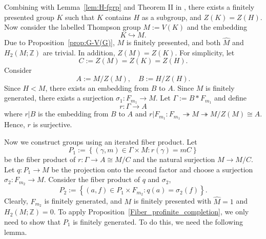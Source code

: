 \documentclass[11pt]{amsart}
\theoremstyle{definition}
\newcommand{\ZZ}{\mathbb{Z}}
\begin{document}
 Combining with Lemma~\ref{lem:H-fgrp} and Theorem II in \cite{houcine2007embeddings}, there exists a finitely presented group $K$ such that $K$ contains $H$ as a subgroup, and $Z(K)=Z(H)$.
 Now consider the labelled Thompson group $M:=V(K)$ and the embedding $$K \hookrightarrow M.$$
 Due to Proposition~\ref{prop:G-V(G)}, $M$ is finitely presented, and both $\widehat{M}$ and $H_2(M;\ZZ)$ are trivial.
 In addition, $Z(M)=Z(K)$.
 For simplicity, let $$ C:=Z(M)=Z(K)=Z(H). $$
 Consider $$ A:=M/Z(M), \quad B:= H / Z(H). $$
 Since $H<M$, there exists an embedding from $B$ to $A$.
 Since $M$ is finitely generated, there exists a surjection $\sigma_1:F_{m_1} \to M$.
 Let $\Gamma := B*F_{m_1} $ and define $$r:\Gamma \to A$$
 where $r|B$ is the embedding from $B$ to $A$ and $r|F_{m_1}:F_{m_1} \twoheadrightarrow M \twoheadrightarrow M/Z(M) \cong A$.
 Hence, $r$ is surjective.

 Now we construct groups using an iterated fiber product.
 Let $$P_1 := \left \{ (\gamma,m) \in \Gamma \times M : r(\gamma)=mC \right \}$$ be the fiber product of $r:\Gamma \to A \cong M/C$ and the natural surjection $M \to M/C$.
 Let $q: P_1 \to M$ be the projection onto the second factor and choose a surjection $\sigma_2:F_{m_2} \to M$. 
 Consider the fiber product of $q$ and $\sigma_2$, $$P_2 := \left \{ (a,f) \in P_1 \times F_{m_2} : q(a)=\sigma_2(f) \right \}. $$
 Clearly, $F_{m_2}$ is finitely generated, and $M$ is finitely presented with $\widehat{M}=1$ and $H_2(M;\ZZ)=0$.
 To apply Proposition~\ref{Fiber_profinite_completion}, we only need to show that $P_1$ is finitely generated.
 To do this, we need the following lemma.
\end{document}
